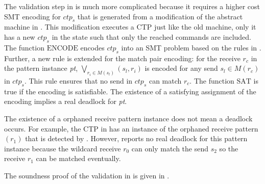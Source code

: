 The validation step in  is much more complicated because it requires a higher cost SMT encoding for $\mathit{ctp_s}$ that is generated from a modification of the abstract machine in .
This modification executes a CTP just like the old machine, only it has a new $\mathit{ctp_s}$ in the state such that only the reached commands are included. 
The function $\mathrm{ENCODE}$ encodes $\mathit{ctp_s}$ into an SMT problem based on the rules in \cite{DBLP:conf/kbse/HuangMM13}. Further, a new rule is extended for the match pair encoding: for the receive $\mathit{r_c}$ in the pattern instance \textit{pt}, $\bigvee_{\mathit{r_i}\in\mathit{M}(\mathit{s_l})}(\mathit{s_l},\mathit{r_i})$ is encoded for any send $\mathit{s_l}\in\mathit{M}(\mathit{r_c})$ in $\mathit{ctp_s}$. This rule ensures that no send in $\mathit{ctp_s}$ can match $\mathit{r_c}$. The function $\mathrm{SAT}$ is true if the encoding is satisfiable. The existence of a satisfying assignment of the encoding implies a real deadlock for \textit{pt}. 

\examplefigtwo

The existence of a orphaned receive pattern instance does not mean a deadlock occurs. For example, the CTP in  has an instance of the orphaned receive pattern $(r_1)$ that is detected by . However,  reports no real deadlock for this pattern instance because the wildcard receive $r_0$ can only match the send $s_2$ so the receive $r_1$ can be matched eventually.

The soundness proof of the validation in  is given in .

